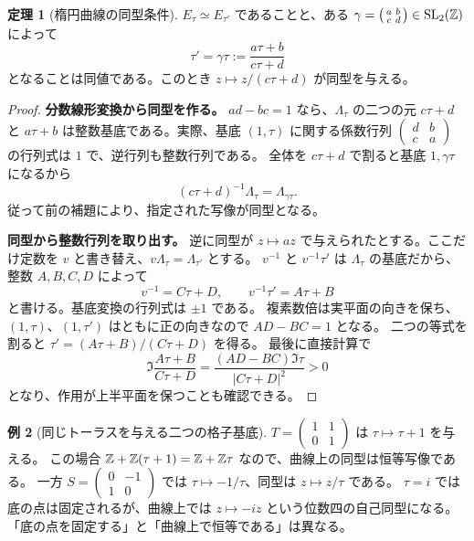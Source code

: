 \documentclass[dvipdfmx,a4paper,11pt]{article}
\theoremstyle{definition}
\newtheorem{thm}{定理}[section]
\newtheorem{exa}[thm]{例}
\DeclareMathOperator{\SL}{SL}\DeclareMathOperator{\PGL}{PGL}\DeclareMathOperator{\PSL}{PSL}
\begin{document}
\begin{thm}[楕円曲線の同型条件]\label{thm:elliso}
$E_\tau\simeq E_{\tau'}$ であることと、ある
$\gamma=\left(\begin{smallmatrix}a&b\\c&d\end{smallmatrix}\right)\in\SL_2(\Z)$ によって
\[
\tau'=\gamma\tau:=\frac{a\tau+b}{c\tau+d}
\]
となることは同値である。このとき $z\mapsto z/(c\tau+d)$ が同型を与える。
\end{thm}
\begin{proof}
\textbf{分数線形変換から同型を作る。}
$ad-bc=1$ なら、$\Lambda_\tau$ の二つの元
$c\tau+d$ と $a\tau+b$ は整数基底である。実際、基底 $(1,\tau)$ に関する係数行列
$\left(\begin{smallmatrix}d&b\\c&a\end{smallmatrix}\right)$ の行列式は $1$ で、逆行列も整数行列である。
全体を $c\tau+d$ で割ると基底 $1,\gamma\tau$ になるから
\[
(c\tau+d)^{-1}\Lambda_\tau=\Lambda_{\gamma\tau}.
\]
従って前の補題により、指定された写像が同型となる。

\textbf{同型から整数行列を取り出す。}
逆に同型が $z\mapsto az$ で与えられたとする。ここだけ定数を $v$ と書き替え、$v\Lambda_\tau=\Lambda_{\tau'}$ とする。
$v^{-1}$ と $v^{-1}\tau'$ は $\Lambda_\tau$ の基底だから、整数 $A,B,C,D$ によって
\[
v^{-1}=C\tau+D,\qquad v^{-1}\tau'=A\tau+B
\]
と書ける。基底変換の行列式は $\pm1$ である。
複素数倍は実平面の向きを保ち、$(1,\tau)$、$(1,\tau')$ はともに正の向きなので $AD-BC=1$ となる。
二つの等式を割ると $\tau'=(A\tau+B)/(C\tau+D)$ を得る。
最後に直接計算で
\[
\Im\frac{A\tau+B}{C\tau+D}
=\frac{(AD-BC)\Im\tau}{|C\tau+D|^2}>0
\]
となり、作用が上半平面を保つことも確認できる。
\end{proof}
\begin{exa}[同じトーラスを与える二つの格子基底]
$T=\left(\begin{smallmatrix}1&1\\0&1\end{smallmatrix}\right)$ は $\tau\mapsto\tau+1$ を与える。
この場合 $\mathbb Z+\mathbb Z(\tau+1)=\mathbb Z+\mathbb Z\tau$ なので、曲線上の同型は恒等写像である。
一方 $S=\left(\begin{smallmatrix}0&-1\\1&0\end{smallmatrix}\right)$ では $\tau\mapsto-1/\tau$、同型は $z\mapsto z/\tau$ である。
$\tau=i$ では底の点は固定されるが、曲線上では $z\mapsto-iz$ という位数四の自己同型になる。
「底の点を固定する」と「曲線上で恒等である」は異なる。
\end{exa}
\end{document}
